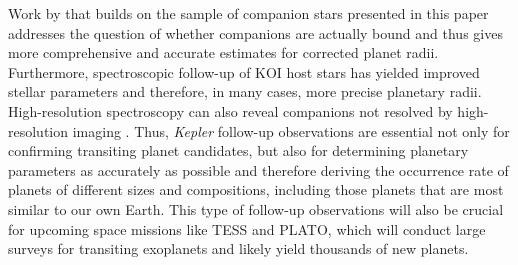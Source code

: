 \documentclass[twocolumn,appendixfloats]{aastex6}
\begin{document}
Work by \citet{hirsch16} that builds on the sample of companion stars 
presented in this paper addresses the question of whether companions 
are actually bound and thus gives more comprehensive and accurate 
estimates for corrected planet radii. 
Furthermore, spectroscopic follow-up of KOI host stars has yielded 
improved stellar parameters and therefore, in many cases, more precise 
planetary radii. High-resolution spectroscopy can also reveal companions
not resolved by high-resolution imaging \citep[see, e.g.,][]{marcy14,kolbl15}.
Thus, {\it Kepler} follow-up observations are essential not only for 
confirming transiting planet candidates, but also for determining planetary 
parameters as accurately as possible and therefore deriving the occurrence 
rate of planets of different sizes and compositions, including those planets 
that are most similar to our own Earth. This type of follow-up observations
will also be crucial for upcoming space missions like TESS and PLATO,
which will conduct large surveys for transiting exoplanets and likely yield
thousands of new planets.
\end{document}
